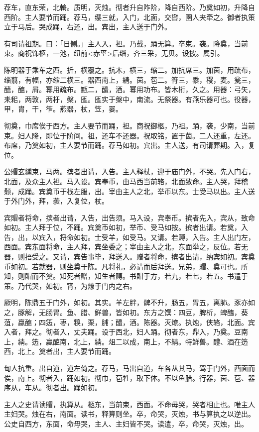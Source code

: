 \documentclass[]{article}
\begin{document}
荐车，直东荣，北輈。质明，灭烛。彻者升自阼阶，降自西阶。乃奠如初，升降自西阶。主人要节而踊。荐马，缨三就，入门，北面，交辔，圉人夹牵之。御者执策立于马后。哭成踊，右还，出。宾出，主人送于门外。

有司请祖期。曰：「日侧。」主人入，袒。乃载，踊无算。卒束。袭。降奠，当前束。商祝饰柩，一池，纽前\textless{}赤巠\textgreater{}后缁，齐三采，无贝。设披。属引。

陈明器于乘车之西。折，横覆之。抗木，横三，缩二。加抗席三。加茵，用疏布，缁翦，有幅，亦缩二横三。器西南上，綪。茵。苞二。筲三，黍，稷，麦。瓮三，醯，醢，屑。幂用疏布。甒二，醴，酒。幂用功布。皆木桁，久之。用器：弓矢，耒耜，两敦，两杅，槃，匜。匜实于槃中，南流。无祭器。有燕乐器可也。役器，甲，胄，干，笮。燕器，杖，笠，翣。

彻奠，巾席俟于西方。主人要节而踊，袒。商祝御柩，乃祖。踊，袭，少南，当前束。妇人降，即位于阶间。祖，还车不还器。祝取铭，置于茵。二人还重，左还。布席，乃奠如初，主人要节而踊。荐马如初。宾出。主人送，有司请葬期。入，复位。

公賵玄纁束，马两。摈者出请，入告。主人释杖，迎于庙门外，不哭。先入门右，北面，及众主人袒。马入设。宾奉币，由马西当前辂，北面致命。主人哭，拜稽颡，成踊。宾奠币于栈左服，出。宰由主人之北，举币以东。士受马以出。主人送于外门外，拜，袭，入复位，杖。

宾賵者将命，摈者出请，入告，出告须。马入设，宾奉币。摈者先入，宾从，致命如初。主人拜于位，不踊。宾奠币如初，举币、受马如按。摈者出请。若奠，入告，出，以宾入，将命如初。士受羊，如受马。又请。若赙，入告。主人出门左，西面。宾东面将命，主人拜，宾坐委之；宰由主人之北，东面举之，反位。若无器，则捂受之。又请，宾告事毕，拜送入。赠者将命，摈者出请，纳宾如初。宾奠币如初。若就器，则坐奠于陈。凡将礼，必请而后拜送。兄弟，賵、奠可也。所知，则賵而不奠。知死者赠，知生者赙。书賵于方，若九，若七，若五。书遣于策。乃代哭，如初。宵，为燎于门内之右。

厥明，陈鼎五于门外，如初。其实。羊左胖，髀不升，肠五，胃五，离肺。豕亦如之，豚解，无肠胃。鱼、腊、鲜兽，皆如初。东方之馔：四豆，脾析，蜱醢，葵菹，蠃醢；四笾，枣，糗，栗，脯；醴，酒。陈器。灭燎。执烛，侠辂，北面。宾入者，拜之。彻者入，丈夫踊。设于西北，妇人踊。彻者东，鼎入，乃奠。豆南上，綪。笾，蠃醢南，北上，綪。俎二以成，南上，不綪。特鲜兽。醴、酒在笾西，北上。奠者出，主人要节而踊。

甸人抗重。出自道，道左倚之。荐马，马出自道，车各从其马，驾于门外，西面而俟，南上。彻者入，踊如初。彻巾，苞牲，取下体。不以鱼腊。行器，茵、苞、器序从，车从。彻者出。踊如初。

主人之史请读賵，执算从。柩东，当前束，西面。不命毋哭，哭者相止也。唯主人主妇哭。烛在右，南面。读书，释算则坐。卒，命哭，灭烛，书与算执之以逆出。公史自西方，东面，命毋哭，主人、主妇皆不哭。读遣，卒，命哭，灭烛，出。
\end{document}
